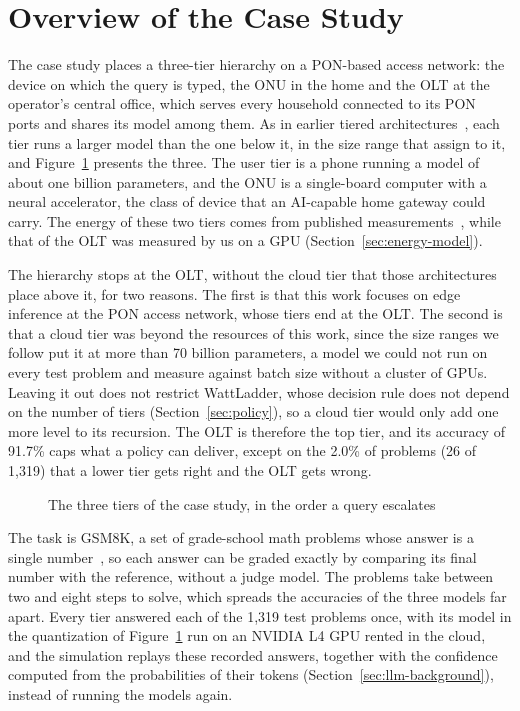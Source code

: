 \documentclass[cic,dipl,english]{infufrgs}
\begin{document}
\section{Overview of the Case Study}
\label{sec:overview}

The case study places a three-tier hierarchy on a PON-based access network: the device on which the query is typed, the ONU in the home and the OLT at the operator's
central office, which serves every household connected to its PON ports and shares its model
among them. As in earlier tiered
architectures~\cite{wu2025recserve,pakpahan2026continuum}, each tier runs a larger model
than the one below it, in the size range that  assign
to it, and Figure~\ref{fig:case-study} presents the three. The user tier is a
phone running a model of about one billion parameters, and the ONU is a single-board
computer with a neural accelerator, the class of device that an AI-capable home gateway
could carry. The energy of these two tiers comes from published
measurements~\cite{cai2026npu,renney2026cloud}, while that of the OLT was measured by us
on a GPU (Section~\ref{sec:energy-model}).

The hierarchy stops at the OLT, without the cloud tier that those architectures place
above it, for two reasons. The first is that this work focuses on edge inference at the PON access network,
whose tiers end at the OLT. The second is that a cloud tier was beyond the resources of
this work, since the size ranges we follow put it at more than 70 billion parameters, a
model we could not run on every test problem and measure against batch size without a
cluster of GPUs. Leaving it out does not
restrict WattLadder, whose decision rule does not depend on the number of tiers
(Section~\ref{sec:policy}), so a cloud tier would only add one more level to its
recursion. The OLT is therefore the top tier, and its accuracy of 91.7\% caps what a policy
can deliver, except on the 2.0\% of problems (26 of 1,319) that a lower tier gets right and
the OLT gets wrong.

\begin{figure}[htb]
  \centering
  \caption{The three tiers of the case study, in the order a query escalates}
  \label{fig:case-study}
  \vspace{6pt}
  
\end{figure}

The task is GSM8K, a set of grade-school math problems whose answer is a single
number~\cite{cobbe2021training}, so each answer can be graded exactly by comparing its
final number with the reference, without a judge model. The problems take between two
and eight steps to solve, which spreads the accuracies of the three models far apart.
Every tier answered each of the 1,319 test problems once, with its model in the quantization
of Figure~\ref{fig:case-study} run on an NVIDIA L4 GPU rented in the cloud, and the simulation
replays these recorded answers, together with the confidence computed from the probabilities of
their tokens (Section~\ref{sec:llm-background}), instead of running the models again.
\end{document}
